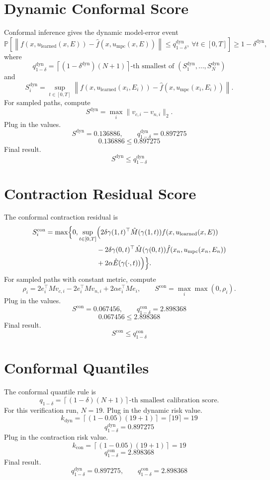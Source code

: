 \documentclass[11pt]{article}
\begin{document}
\section*{Dynamic Conformal Score}

Conformal inference gives the dynamic model-error event
\[
\mathbb P\left[
\left\|f(x,u_{\mathrm{learned}}(x,E))-\hat f(x,u_{\mathrm{mpc}}(x,E))\right\|
\le q_{1-\delta}^{\mathrm{dyn}},
\ \forall t\in[0,T]
\right]\ge 1-\delta^{\mathrm{dyn}},
\]
where
\[
q_{1-\delta}^{\mathrm{dyn}}
=
\left\lceil(1-\delta^{\mathrm{dyn}})(N+1)\right\rceil
\text{-th smallest of }
(S_1^{\mathrm{dyn}},\ldots,S_N^{\mathrm{dyn}})
\]
and
\[
S_i^{\mathrm{dyn}}
=
\sup_{t\in[0,T]}
\left\|f(x,u_{\mathrm{learned}}(x_i,E_i))
-\hat f(x,u_{\mathrm{mpc}}(x_i,E_i))\right\|.
\]
For sampled paths, compute
\[
S^{\mathrm{dyn}}=\max_i\|v_{c,i}-v_{n,i}\|_2.
\]
Plug in the values.
\[
S^{\mathrm{dyn}}=0.136886,\qquad q_{1-\delta}^{\mathrm{dyn}}=0.897275
\]
\[
0.136886\le0.897275
\]
Final result.
\[
\boxed{S^{\mathrm{dyn}}\le q_{1-\delta}^{\mathrm{dyn}}}
\]

\section*{Contraction Residual Score}

The conformal contraction residual is
\[
\begin{aligned}
S_i^{\mathrm{con}}
=\max\Bigl\{0,\sup_{t\in[0,T]}
&\Bigl(
2\delta\gamma(1,t)^\top\hat M(\gamma(1,t))f(x,u_{\mathrm{learned}}(x,E))\\
&-2\delta\gamma(0,t)^\top\hat M(\gamma(0,t))\hat f(x_n,u_{\mathrm{mpc}}(x_n,E_n))\\
&+2\alpha \hat E(\gamma(\cdot,t))
\Bigr)\Bigr\}.
\end{aligned}
\]
For sampled paths with constant metric, compute
\[
\rho_i
=
2e_i^\top Mv_{c,i}
-2e_i^\top Mv_{n,i}
+2\alpha e_i^\top M e_i,
\qquad
S^{\mathrm{con}}=\max_i\max(0,\rho_i).
\]
Plug in the values.
\[
S^{\mathrm{con}}=0.067456,\qquad q_{1-\delta}^{\mathrm{con}}=2.898368
\]
\[
0.067456\le2.898368
\]
Final result.
\[
\boxed{S^{\mathrm{con}}\le q_{1-\delta}^{\mathrm{con}}}
\]

\section*{Conformal Quantiles}

The conformal quantile rule is
\[
q_{1-\delta}
=
\left\lceil(1-\delta)(N+1)\right\rceil
\text{-th smallest calibration score}.
\]
For this verification run, \(N=19\).
Plug in the dynamic risk value.
\[
k_{\mathrm{dyn}}
=\left\lceil(1-0.05)(19+1)\right\rceil
=\lceil19\rceil
=19
\]
\[
q_{1-\delta}^{\mathrm{dyn}}=0.897275
\]
Plug in the contraction risk value.
\[
k_{\mathrm{con}}
=\left\lceil(1-0.05)(19+1)\right\rceil
=19
\]
\[
q_{1-\delta}^{\mathrm{con}}=2.898368
\]
Final result.
\[
\boxed{
q_{1-\delta}^{\mathrm{dyn}}=0.897275,\qquad
q_{1-\delta}^{\mathrm{con}}=2.898368
}
\]
\end{document}
